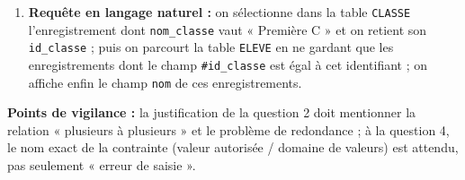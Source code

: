 \documentclass[11pt]{article}
\begin{document}
\begin{corrige}
\begin{enumerate}
\item \textbf{Requête en langage naturel :} on sélectionne dans la table \texttt{CLASSE} l'enregistrement dont \texttt{nom\_classe} vaut « Première C » et on retient son \texttt{id\_classe} ; puis on parcourt la table \texttt{ELEVE} en ne gardant que les enregistrements dont le champ \texttt{\#id\_classe} est égal à cet identifiant ; on affiche enfin le champ \texttt{nom} de ces enregistrements.
\end{enumerate}

\textbf{Points de vigilance :} la justification de la question 2 doit mentionner la relation « plusieurs à plusieurs » et le problème de redondance ; à la question 4, le nom exact de la contrainte (valeur autorisée / domaine de valeurs) est attendu, pas seulement « erreur de saisie ».
\end{corrige}
\end{document}
